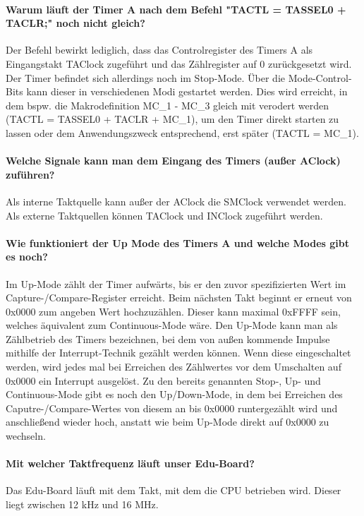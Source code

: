 \documentclass[12pt,a4paper,bibliography=totocnumbered,listof=totocnumbered]{scrartcl}
\begin{document}
\paragraph{Warum läuft der Timer A nach dem Befehl "TACTL = TASSEL0 + TACLR;" noch nicht gleich?}
Der Befehl bewirkt lediglich, dass das Controlregister des Timers A als Eingangstakt TAClock zugeführt und das Zählregister auf 0 zurückgesetzt wird. Der Timer befindet sich allerdings noch im Stop-Mode. Über die Mode-Control-Bits kann dieser in verschiedenen Modi gestartet werden. Dies wird erreicht, in dem bspw. die Makrodefinition MC\_1 - MC\_3 gleich mit verodert werden (TACTL = TASSEL0 + TACLR + MC\_1), um den Timer direkt starten zu lassen oder dem Anwendungszweck entsprechend, erst später (TACTL \text{\textbar}= MC\_1). 

\paragraph{Welche Signale kann man dem Eingang des Timers (außer AClock) zuführen?} Als interne Taktquelle kann außer der AClock die SMClock verwendet werden. Als externe Taktquellen können TAClock und INClock zugeführt werden.

\paragraph{Wie funktioniert der Up Mode des Timers A und welche Modes gibt es noch?} Im Up-Mode zählt der Timer aufwärts, bis er den zuvor spezifizierten Wert im Capture-/Compare-Register erreicht. Beim nächsten Takt beginnt er erneut von 0x0000 zum angeben Wert hochzuzählen. Dieser kann maximal 0xFFFF sein, welches äquivalent zum Continuous-Mode wäre. Den Up-Mode kann man als Zählbetrieb des Timers bezeichnen, bei dem von außen kommende Impulse mithilfe der Interrupt-Technik gezählt werden können. Wenn diese eingeschaltet werden, wird jedes mal bei Erreichen des Zählwertes vor dem Umschalten auf 0x0000 ein Interrupt ausgelöst. Zu den bereits genannten Stop-, Up- und Continuous-Mode gibt es noch den Up/Down-Mode, in dem bei Erreichen des Caputre-/Compare-Wertes von diesem an bis 0x0000 runtergezählt wird und anschließend wieder hoch, anstatt wie beim Up-Mode direkt auf 0x0000 zu wechseln.

\paragraph{Mit welcher Taktfrequenz läuft unser Edu-Board?}
Das Edu-Board läuft mit dem Takt, mit dem die CPU betrieben wird. Dieser liegt zwischen 12 kHz und 16 MHz. \cite[Seite 6]{MPT.Praktikum.Wuest}
\end{document}

